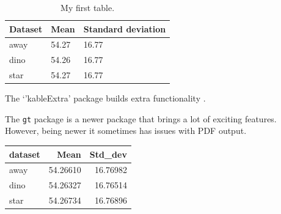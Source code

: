 \documentclass[
]{book}
\newenvironment{Shaded}{\begin{snugshade}}{\end{snugshade}}
\newcommand{\DataTypeTok}[1]{\textcolor[rgb]{0.13,0.29,0.53}{#1}}
\newcommand{\DecValTok}[1]{\textcolor[rgb]{0.00,0.00,0.81}{#1}}
\newcommand{\KeywordTok}[1]{\textcolor[rgb]{0.13,0.29,0.53}{\textbf{#1}}}
\newcommand{\NormalTok}[1]{#1}
\newcommand{\OperatorTok}[1]{\textcolor[rgb]{0.81,0.36,0.00}{\textbf{#1}}}
\newcommand{\StringTok}[1]{\textcolor[rgb]{0.31,0.60,0.02}{#1}}
\begin{document}
\begin{Shaded}
\end{Shaded}

\begin{table}

\caption{\label{tab:unnamed-chunk-95}My first table.}
\centering
\begin{tabular}[t]{l|l|l}
\hline
Dataset & Mean & Standard deviation\\
\hline
away & 54.27 & 16.77\\
\hline
dino & 54.26 & 16.77\\
\hline
star & 54.27 & 16.77\\
\hline
\end{tabular}
\end{table}

The `'kableExtra' package builds extra functionality \citep{citekableextra}.

The \texttt{gt} package \citep{citegt} is a newer package that brings a lot of exciting features. However, being newer it sometimes has issues with PDF output.

\begin{Shaded}
\end{Shaded}

\captionsetup[table]{labelformat=empty,skip=1pt}
\begin{longtable}{lrr}
\toprule
dataset & Mean & Std\_dev \\ 
\midrule
away & 54.26610 & 16.76982 \\ 
dino & 54.26327 & 16.76514 \\ 
star & 54.26734 & 16.76896 \\ 
\bottomrule
\end{longtable}
\end{document}
